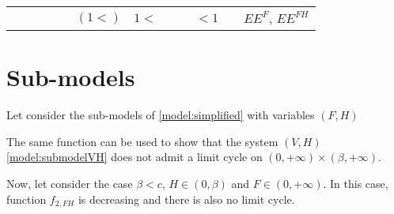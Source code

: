 \documentclass{article}
\begin{document}
\begin{landscape}
\begin{table}
\begin{tabular}{c|c|c|c|c|c|c|c|c|c|c|c}
 & & & & &$(1<)$ &$1<$ & & & $<1$ & & $EE^F$, $EE^{FH}$ \\
\end{tabular}
\end{table}

\end{landscape}

\section{Sub-models}
Let consider the sub-models of \eqref{model:simplified} with variables $(F,H)$ 

The same function can be used to show that the system $(V,H)$ \eqref{model:submodelVH} does not admit a limit cycle on $(0, +\infty) \times (\beta, +\infty)$.

Now, let consider the case $\beta < c$, $ H \in (0,\beta)$ and $F \in (0, +\infty)$. In this case, function $f_{2,FH}$  is decreasing and there is also no limit cycle.
\end{document}
